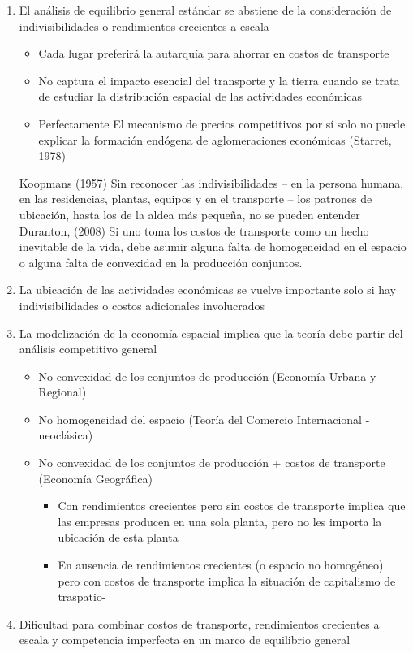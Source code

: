 \begin{enumerate}
    \item El análisis de equilibrio general estándar se abstiene de la consideración de indivisibilidades o rendimientos crecientes a escala 
	\begin{itemize}
	    \item Cada lugar preferirá la autarquía para ahorrar en costos de transporte 
	    \item No captura el impacto esencial del transporte y la tierra cuando se trata de estudiar la distribución espacial de las actividades económicas 
	    \item Perfectamente El mecanismo de precios competitivos por sí solo no puede explicar la formación endógena de aglomeraciones económicas (Starret, 1978)
	\end{itemize}

		Koopmans (1957) Sin reconocer las indivisibilidades – en la persona humana, en las residencias, plantas, equipos y en el transporte – los patrones de ubicación, hasta los de la aldea más pequeña, no se pueden entender Duranton, (2008) Si uno toma los costos de transporte como un hecho inevitable de la vida, debe asumir alguna falta de homogeneidad en el espacio o alguna falta de convexidad en la producción conjuntos.\\
    \item La ubicación de las actividades económicas se vuelve importante solo si hay indivisibilidades o costos adicionales involucrados
    \item La modelización de la economía espacial implica que la teoría debe partir del análisis competitivo general
	\begin{itemize}
	    \item No convexidad de los conjuntos de producción (Economía Urbana y Regional)
	    \item No homogeneidad del espacio (Teoría del Comercio Internacional -neoclásica) 
	    \item No convexidad de los conjuntos de producción + costos de transporte (Economía Geográfica) 
		\begin{itemize}
		    \item Con rendimientos crecientes pero sin costos de transporte implica que las empresas producen en una sola planta, pero no les importa la ubicación de esta planta 
		    \item En ausencia de rendimientos crecientes (o espacio no homogéneo) pero con costos de transporte implica la situación de capitalismo de traspatio-
		\end{itemize}
	\end{itemize}
    \item Dificultad para combinar costos de transporte, rendimientos crecientes a escala y competencia imperfecta en un marco de equilibrio general

\end{enumerate}

